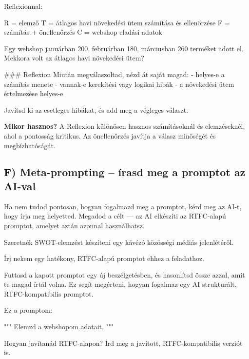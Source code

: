 \documentclass[11pt,a4paper]{article}
\newcommand{\tip}[1]{%
  \vspace{3pt}%
  \begin{tcolorbox}[tipstyle]%
  \textbf{\textcolor{tipborder}{Mikor hasznos?}} #1%
  \end{tcolorbox}\vspace{2pt}}
\newcommand{\lbl}[1]{\vspace{6pt}\noindent{\small\bfseries\textcolor{labelcolor}{#1}}\par\smallskip}
\begin{document}
\noindent Reflexionnal:

\begin{prompt}

R = elemző
T = átlagos havi növekedési ütem számítása és ellenőrzése
F = számítás + önellenőrzés
C = webshop eladási adatok

Egy webshop januárban 200, februárban 180, márciusban 260
terméket adott el. Mekkora volt az átlagos havi növekedési ütem?

### Reflexion
Miután megválaszoltad, nézd át saját magad:
- helyes-e a számítás menete
- vannak-e kerekítési vagy logikai hibák
- a növekedési ütem értelmezése helyes-e

Javítsd ki az esetleges hibákat, és add meg a végleges választ.
\end{prompt}

\tip{A Reflexion különösen hasznos számításoknál és elemzéseknél, ahol a
pontosság kritikus. Az önellenőrzés javítja a válasz minőségét és
megbízhatóságát.}

\subsection{F) Meta-prompting -- írasd meg a promptot az AI-val}

Ha nem tudod pontosan, hogyan fogalmazd meg a promptot, kérd meg az AI-t,
hogy írja meg helyetted. Megadod a célt — az AI elkészíti az RTFC-alapú promptot,
amelyet aztán azonnal használhatsz.

\lbl{1. példa -- prompt generálás nulláról}

\begin{prompt}
Szeretnék SWOT-elemzést készíteni egy kávézó közösségi médiás jelenlétéről.

Írj nekem egy hatékony, RTFC-alapú promptot ehhez a feladathoz.
\end{prompt}

Futtasd a kapott promptot egy új beszélgetésben, és hasonlítsd össze azzal,
amit te magad írtál volna. Ez segít megérteni, hogyan fogalmaz egy AI
strukturált, RTFC-kompatibilis promptot.

\lbl{2. példa -- prompt fejlesztése RTFC-alapon}

\begin{prompt}
Ez a promptom:

"""
Elemzd a webshopom adatait.
"""

Hogyan javítanád RTFC-alapon?
Írd meg a javított, RTFC-kompatibilis verziót is.
\end{prompt}
\end{document}
